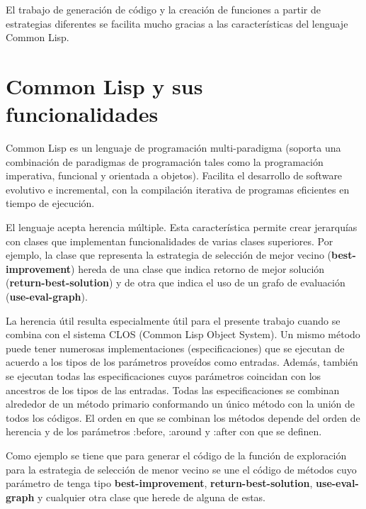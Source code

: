 El trabajo de generación de código y la creación de funciones a partir de estrategias diferentes se facilita mucho gracias a las características del lenguaje Common Lisp.

\section{Common Lisp y sus funcionalidades}\label{2-Lisp}
Common Lisp es un lenguaje de programación multi-paradigma (soporta una combinación de paradigmas de programación tales como la programación imperativa, funcional y orientada a objetos). Facilita el desarrollo de software evolutivo e incremental, con la compilación iterativa de programas eficientes en tiempo de ejecución.

El lenguaje acepta herencia múltiple. Esta característica permite crear jerarquías con clases que implementan funcionalidades de varias clases superiores. Por ejemplo, la clase que representa la estrategia de selección de mejor vecino (\textbf{best-improvement}) hereda de una clase que indica  retorno de mejor solución (\textbf{return-best-solution}) y de otra que indica el uso de un grafo de evaluación (\textbf{use-eval-graph}).

La herencia útil resulta especialmente útil para el presente trabajo cuando se combina con el sistema CLOS (Common Lisp Object System). Un mismo método puede tener numerosas implementaciones (especificaciones) que se ejecutan de acuerdo a los tipos de los parámetros proveídos como entradas. Además, también se ejecutan todas las especificaciones cuyos parámetros coincidan con los ancestros de los tipos de las entradas. Todas las especificaciones se combinan alrededor de un método primario conformando un único método con la unión de todos los códigos. El orden en que se combinan los métodos depende del orden de herencia y de los parámetros :before, :around y :after con que se definen.

Como ejemplo se tiene que para generar el código de la función de exploración para la estrategia de selección de menor vecino se une el código de métodos cuyo parámetro de  tenga tipo \textbf{best-improvement}, \textbf{return-best-solution}, \textbf{use-eval-graph} y cualquier otra clase que herede de alguna de estas.



























